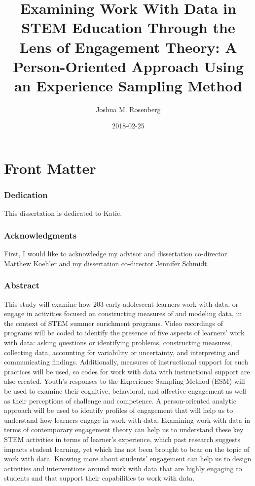 \documentclass[]{book}
\title{Examining Work With Data in STEM Education Through the Lens of
Engagement Theory: A Person-Oriented Approach Using an Experience
Sampling Method}
\author{Joshua M. Rosenberg}
\date{2018-02-25}
\theoremstyle{definition}
\theoremstyle{definition}
\theoremstyle{definition}
\theoremstyle{remark}
\begin{document}
\maketitle

{
\setcounter{tocdepth}{1}
\tableofcontents
}
\chapter{Front Matter}\label{front-matter}

\subsection{Dedication}\label{dedication}

This dissertation is dedicated to Katie.

\subsection{Acknowledgments}\label{acknowledgments}

First, I would like to acknowledge my advisor and dissertation
co-director Matthew Koehler and my dissertation co-director Jennifer
Schmidt.

\subsection{Abstract}\label{abstract}

This study will examine how 203 early adolescent learners work with
data, or engage in activities focused on constructing measures of and
modeling data, in the context of STEM summer enrichment programs. Video
recordings of programs will be coded to identify the presence of five
aspects of learners' work with data: asking questions or identifying
problems, constructing measures, collecting data, accounting for
variability or uncertainty, and interpreting and communicating findings.
Additionally, measures of instructional support for such practices will
be used, so codes for work with data with instructional support are also
created. Youth's responses to the Experience Sampling Method (ESM) will
be used to examine their cognitive, behavioral, and affective engagement
as well as their perceptions of challenge and competence. A
person-oriented analytic approach will be used to identify profiles of
engagement that will help us to understand how learners engage in work
with data. Examining work with data in terms of contemporary engagement
theory can help us to understand these key STEM activities in terms of
learner's experience, which past research suggests impacts student
learning, yet which has not been brought to bear on the topic of work
with data. Knowing more about students' engagement can help us to design
activities and interventions around work with data that are highly
engaging to students and that support their capabilities to work with
data.
\end{document}

